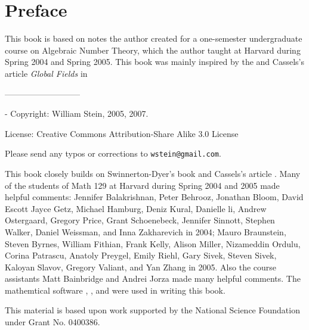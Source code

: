 \chapter*{Preface}

This book is based on notes the author created for a one-semester
undergraduate course on Algebraic Number Theory, which the author
taught at Harvard during Spring 2004 and Spring 2005.  This book was
mainly inspired by the \cite[Ch.~1]{sd:brief} and Cassels's article
{\em Global Fields} in \cite{cassels:global}

\vspace{0.3in}
\begin{center}
---------------------------
\end{center}-
\vspace{0.3in}
\noindent{}Copyright: William Stein, 2005, 2007.

\vspace{0.2in}
\noindent{}License: Creative Commons Attribution-Share Alike 3.0 License

\vspace{0.2in}
\noindent{}Please send any typos or corrections to {\tt wstein@gmail.com}.

\newpage
{} This book closely builds on
Swinnerton-Dyer's book \cite{sd:brief} and Cassels's article
\cite{cassels:global}. Many of the students of Math 129 at Harvard
during Spring 2004 and 2005 made helpful comments: Jennifer
Balakrishnan, Peter Behrooz, Jonathan Bloom, David Escott Jayce Getz,
Michael Hamburg, Deniz Kural, Danielle li, Andrew Ostergaard, Gregory
Price, Grant Schoenebeck, Jennifer Sinnott, Stephen Walker, Daniel
Weissman, and Inna Zakharevich in 2004; Mauro Braunstein, Steven
Byrnes, William Fithian, Frank Kelly, Alison Miller, Nizameddin
Ordulu, Corina Patrascu, Anatoly Preygel, Emily Riehl, Gary Sivek,
Steven Sivek, Kaloyan Slavov, Gregory Valiant, and Yan Zhang in 2005.
Also the course assistants Matt Bainbridge and Andrei Jorza made many
helpful comments.  The mathemtical software \cite{sage}, \cite{pari},
and \cite{magma} were used in writing this book. 

\vspace{5ex}
\noindent{}This material is based upon work supported by the National Science
Foundation under Grant No. 0400386.




